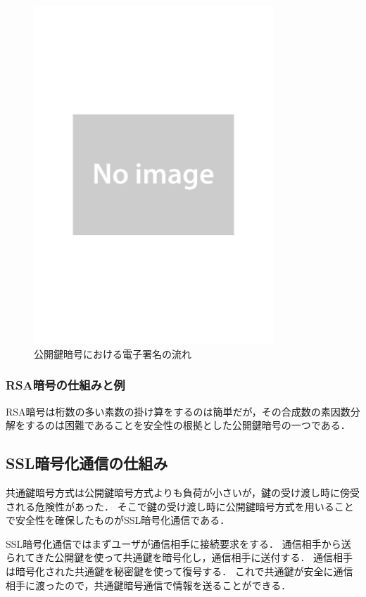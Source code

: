 \documentclass[a4j,12pt]{jsarticle}
\begin{document}
\begin{figure}[H]
\centering
\includegraphics[width=9cm]{noimage.pdf}
\caption{公開鍵暗号における電子署名の流れ}
\label{fig:no}
\end{figure} 




\subsubsection{RSA暗号の仕組みと例}
RSA暗号は桁数の多い素数の掛け算をするのは簡単だが，その合成数の素因数分解をするのは困難であることを安全性の根拠とした公開鍵暗号の一つである．



\subsection{SSL暗号化通信の仕組み}
共通鍵暗号方式は公開鍵暗号方式よりも負荷が小さいが，鍵の受け渡し時に傍受される危険性があった．
そこで鍵の受け渡し時に公開鍵暗号方式を用いることで安全性を確保したものがSSL暗号化通信である．

SSL暗号化通信ではまずユーザが通信相手に接続要求をする．
通信相手から送られてきた公開鍵を使って共通鍵を暗号化し，通信相手に送付する．
通信相手は暗号化された共通鍵を秘密鍵を使って復号する．
これで共通鍵が安全に通信相手に渡ったので，共通鍵暗号通信で情報を送ることができる．
\end{document}
